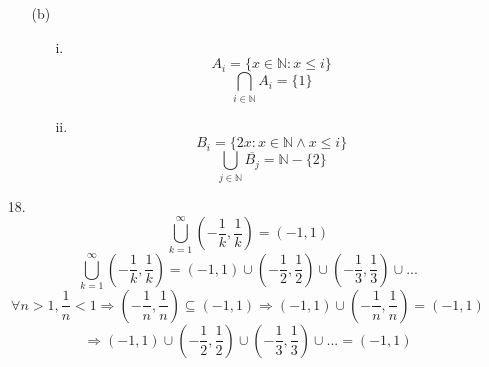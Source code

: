 \documentclass{article}
\begin{document}
\begin{enumerate}
\begin{enumerate}
\begin{enumerate}
				\end{enumerate}

			\item[(b)]
				\begin{enumerate}
					\item[i.]
						\[A_{i} = \{x \in \mathbb{N} : x \leq  i\}\]
						\[\bigcap_{i \in \mathbb{N}}A_{i} = \{1\}\]

					\item[ii.]
						\[B_{i} = \{2x : x \in \mathbb{N} \land x \leq i\}\]
						\[\bigcup_{j \in \mathbb{N}}\overline{B_{j}} = \mathbb{N} - \{2\}\]
					
				\end{enumerate}

		\end{enumerate}

		\item[18.]
			\[\bigcup_{k=1}^{\infty} \left( -\frac{1}{k},\frac{1}{k} \right) = (-1, 1)\]
			\[\bigcup_{k=1}^{\infty} \left( -\frac{1}{k},\frac{1}{k} \right) = (-1,1) \cup \left( -\frac{1}{2}, \frac{1}{2} \right) \cup \left( -\frac{1}{3}, \frac{1}{3} \right) \cup ...\]
			\[\forall n > 1, \frac{1}{n} < 1 \Rightarrow \left( -\frac{1}{n},\frac{1}{n} \right) \subseteq (-1,1) \Rightarrow (-1, 1) \cup \left( -\frac{1}{n},\frac{1}{n} \right) = (-1,1)\]
			\[\Rightarrow \left( -1,1 \right) \cup \left( -\frac{1}{2}, \frac{1}{2} \right) \cup \left( -\frac{1}{3}, \frac{1}{3} \right) \cup ... = (-1, 1)\]

\end{enumerate}
\end{document}
